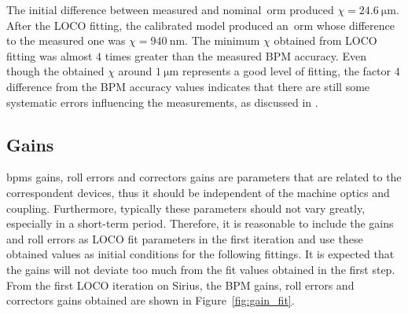The initial difference between measured and nominal~\gls{orm} produced $\chi = \SI{24.6}{\micro\meter}$. After the LOCO fitting, the calibrated model produced an~\gls{orm} whose difference to the measured one was $\chi = \SI{940}{\nano\meter}$. The minimum $\chi$ obtained from LOCO fitting was almost $4$ times greater than the measured BPM accuracy. Even though the obtained $\chi$ around $\SI{1}{\micro\meter}$ represents a good level of fitting, the factor $4$ difference from the BPM accuracy values indicates that there are still some systematic errors influencing the measurements, as discussed in \cite{safranek1995}.

\subsection{Gains}
\glspl{bpm} gains, roll errors and correctors gains are parameters that are related to the correspondent devices, thus it should be independent of the machine optics and coupling. Furthermore, typically these parameters should not vary greatly, especially in a short-term period. Therefore, it is reasonable to include the gains and roll errors as LOCO fit parameters in the first iteration and use these obtained values as initial conditions for the following fittings. It is expected that the gains will not deviate too much from the fit values obtained in the first step. From the first LOCO iteration on Sirius, the BPM gains, roll errors and correctors gains obtained are shown in Figure~\ref{fig:gain_fit}.
